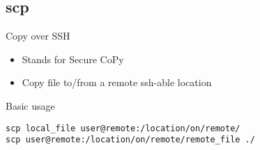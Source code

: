 \subsection{scp}

\begin{frame}[fragile]{Copy over SSH}
  \begin{itemize}
    \pause \item Stands for Secure CoPy
    \pause \item Copy  file to/from a remote ssh-able location
  \end{itemize}
  \pause

  \begin{exampleblock}{Basic usage}
    \begin{lstlisting}[showstringspaces=false,basicstyle=\tiny]
scp local_file user@remote:/location/on/remote/
scp user@remote:/location/on/remote/remote_file ./
    \end{lstlisting}
  \end{exampleblock}
\end{frame}


